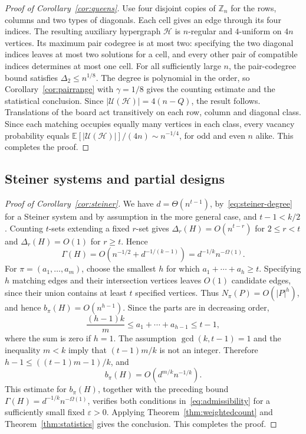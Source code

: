 \documentclass[11pt,reqno]{amsart}
\numberwithin{equation}{section}
\theoremstyle{plain}
\theoremstyle{definition}
\newcommand{\calH}{\mathcal{H}}
\newcommand{\E}{\mathbb E}
\newcommand{\eps}{\varepsilon}
\newcommand{\calU}{\mathcal U}
\begin{document}
\begin{proof}[Proof of Corollary~\ref{cor:queens}]
    Use four disjoint copies of $\mathbb Z_n$ for the rows, columns and two types of diagonals.
    Each cell gives an edge through its four indices.
    The resulting auxiliary hypergraph $\calH$ is $n$-regular and $4$-uniform on $4n$ vertices.
    Its maximum pair codegree is at most two: specifying the two diagonal indices leaves at most two solutions for a cell, and every other pair of compatible indices determines at most one cell.
    For all sufficiently large $n$, the pair-codegree bound satisfies $\Delta_2\le n^{1/8}$.
    The degree is polynomial in the order, so Corollary~\ref{cor:pairrange} with $\gamma=1/8$ gives the counting estimate and the statistical conclusion.
    Since $|\calU(\calH)|=4(n-Q)$, the result follows.
    Translations of the board act transitively on each row, column and diagonal class.
    Since each matching occupies equally many vertices in each class, every vacancy probability equals $\E[|\calU(\calH)|]/(4n)\sim n^{-1/4}$, for odd and even $n$ alike.
    This completes the proof.
\end{proof}

\subsection{Steiner systems and partial designs}\label{subsec:designproofs}

\begin{proof}[Proof of Corollary~\ref{cor:steiner}]
    We have $d=\Theta(n^{t-1})$, by~\eqref{eq:steiner-degree} for a Steiner system and by assumption in the more general case, and $t-1<k/2$.
    Counting $t$-sets extending a fixed $r$-set gives $\Delta_r(H)=O(n^{t-r})$ for $2\le r<t$ and $\Delta_r(H)=O(1)$ for $r\ge t$.
    Hence
    \[
        \Gamma(H)=O(n^{-1/2}+d^{-1/(k-1)})=d^{-1/k}n^{-\Omega(1)}.
    \]
    For $\pi=(a_1,\ldots,a_m)$, choose the smallest $h$ for which $a_1+\cdots+a_h\ge t$.
    Specifying $h$ matching edges and their intersection vertices leaves $O(1)$ candidate edges, since their union contains at least $t$ specified vertices.
    Thus $N_\pi(P)=O(|P|^h)$, and hence $b_\pi(H)=O(n^{h-1})$.
    Since the parts are in decreasing order,
    \[
        \frac{(h-1)k}{m}\le a_1+\cdots+a_{h-1}\le t-1,
    \]
    where the sum is zero if $h=1$.
    The assumption $\gcd(k,t-1)=1$ and the inequality $m<k$ imply that $(t-1)m/k$ is not an integer.
    Therefore $h-1\le((t-1)m-1)/k$, and
    \[
        b_\pi(H)=O(d^{m/k}n^{-1/k}).
    \]
    This estimate for $b_\pi(H)$, together with the preceding bound $\Gamma(H)=d^{-1/k}n^{-\Omega(1)}$, verifies both conditions in~\eqref{eq:admissibility} for a sufficiently small fixed $\eps>0$.
    Applying Theorem~\ref{thm:weightedcount} and Theorem~\ref{thm:statistics} gives the conclusion.
    This completes the proof.
\end{proof}
\end{document}
